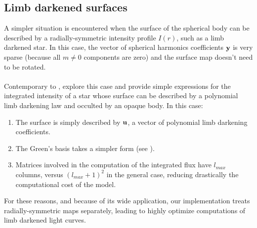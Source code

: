 \documentclass[modern]{aastex631}
\begin{document}
\subsection{Limb darkened surfaces}
A simpler situation is encountered when the surface of the spherical body can be described by a radially-symmetric intensity profile $I(r)$, such as a limb darkened star. In this case, the vector of spherical harmonics coefficients ${\mathbf{y}}$ is very sparse (because all $m\neq0$ components are zero) and the surface map doesn't need to be rotated.\\\\
Contemporary to \cite{starry}, \cite{Agol2020} explore this case and provide simple expressions for the integrated intensity of a star whose surface can be described by a polynomial limb darkening law and occulted by an opaque body. In this case:
\begin{enumerate}
    \item The surface is simply described by ${\mathbf{u}}$, a vector of polynomial limb darkening coefficients.
    \item The Green's basis takes a simpler form (see \citealt[Equation 14]{Agol2020}).
    \item Matrices involved in the computation of the integrated flux have $l_{max}$ columns, versus $(l_{max}+1)^2$ in the general case, reducing drastically the computational cost of the model.
\end{enumerate}
For these reasons, and because of its wide application, our implementation treats radially-symmetric maps separately, leading to highly optimize computations of limb darkened light curves.\\\\

\newpage
\end{document}
